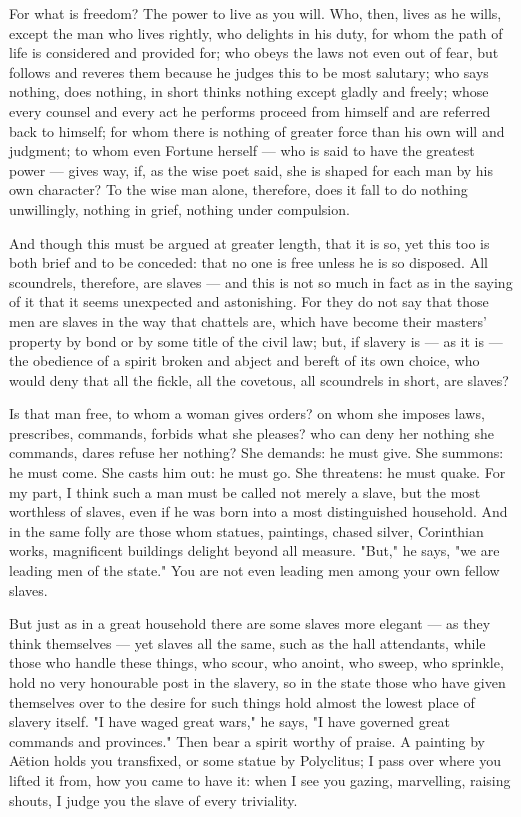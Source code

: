  For what is freedom? The power to live as you will. Who, then, lives as he wills, except the man who lives rightly, who delights in his duty, for whom the path of life is considered and provided for; who obeys the laws not even out of fear, but follows and reveres them because he judges this to be most salutary; who says nothing, does nothing, in short thinks nothing except gladly and freely; whose every counsel and every act he performs proceed from himself and are referred back to himself; for whom there is nothing of greater force than his own will and judgment; to whom even Fortune herself — who is said to have the greatest power — gives way, if, as the wise poet said, she is shaped for each man by his own character? To the wise man alone, therefore, does it fall to do nothing unwillingly, nothing in grief, nothing under compulsion.

 And though this must be argued at greater length, that it is so, yet this too is both brief and to be conceded: that no one is free unless he is so disposed. All scoundrels, therefore, are slaves — and this is not so much in fact as in the saying of it that it seems unexpected and astonishing. For they do not say that those men are slaves in the way that chattels are, which have become their masters' property by bond or by some title of the civil law; but, if slavery is — as it is — the obedience of a spirit broken and abject and bereft of its own choice, who would deny that all the fickle, all the covetous, all scoundrels in short, are slaves?

 Is that man free, to whom a woman gives orders? on whom she imposes laws, prescribes, commands, forbids what she pleases? who can deny her nothing she commands, dares refuse her nothing? She demands: he must give. She summons: he must come. She casts him out: he must go. She threatens: he must quake. For my part, I think such a man must be called not merely a slave, but the most worthless of slaves, even if he was born into a most distinguished household. And in the same folly are those whom statues, paintings, chased silver, Corinthian works, magnificent buildings delight beyond all measure. "But," he says, "we are leading men of the state." You are not even leading men among your own fellow slaves.

 But just as in a great household there are some slaves more elegant — as they think themselves — yet slaves all the same, such as the hall attendants, while those who handle these things, who scour, who anoint, who sweep, who sprinkle, hold no very honourable post in the slavery, so in the state those who have given themselves over to the desire for such things hold almost the lowest place of slavery itself. "I have waged great wars," he says, "I have governed great commands and provinces." Then bear a spirit worthy of praise. A painting by Aëtion holds you transfixed, or some statue by Polyclitus; I pass over where you lifted it from, how you came to have it: when I see you gazing, marvelling, raising shouts, I judge you the slave of every triviality.


